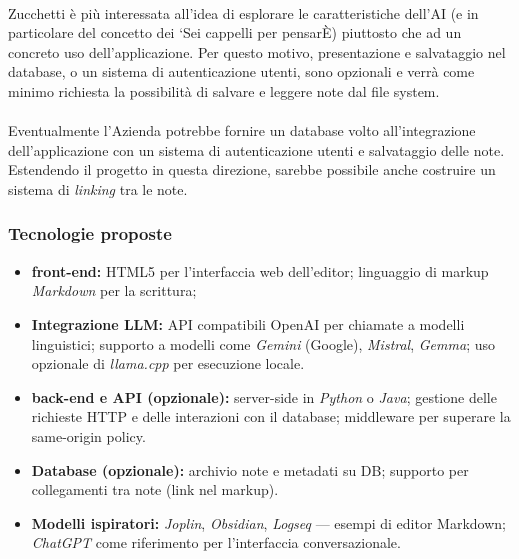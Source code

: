 \documentclass[a4paper,11pt]{article}
\begin{document}
\paragraph{}
Zucchetti è più interessata all'idea di esplorare le caratteristiche dell'AI (e in particolare del concetto dei `Sei cappelli per pensarÈ) piuttosto che ad un concreto uso dell'applicazione. Per questo motivo,
presentazione e salvataggio nel database, o un sistema di autenticazione utenti, sono opzionali e verrà come minimo richiesta la possibilità di salvare e leggere note dal file system.
\paragraph{}
Eventualmente l'Azienda potrebbe fornire un database volto all'integrazione dell'applicazione con un sistema di autenticazione utenti e salvataggio delle note. 
Estendendo il progetto in questa direzione, sarebbe possibile anche costruire un sistema di \textit{linking} tra le note.
\subsubsection{Tecnologie proposte}
\begin{itemize}[noitemsep, topsep=0pt]
 \item \textbf{front-end:} HTML5 per l'interfaccia web dell'editor; linguaggio di markup \textit{Markdown} per la scrittura;
 \item \textbf{Integrazione LLM:} API compatibili OpenAI per chiamate a modelli linguistici; supporto a modelli come \textit{Gemini} (Google), \textit{Mistral}, \textit{Gemma}; uso opzionale di \textit{llama.cpp} per esecuzione locale.
 \item \textbf{back-end e API (opzionale):} server-side in \textit{Python} o \textit{Java}; gestione delle richieste HTTP e delle interazioni con il database; middleware per superare la same-origin policy.
 \item \textbf{Database (opzionale):} archivio note e metadati su DB; supporto per collegamenti tra note (link nel markup).
 \item \textbf{Modelli ispiratori:} \textit{Joplin}, \textit{Obsidian}, \textit{Logseq} — esempi di editor Markdown; \textit{ChatGPT} come riferimento per l'interfaccia conversazionale.
\end{itemize}
\end{document}
